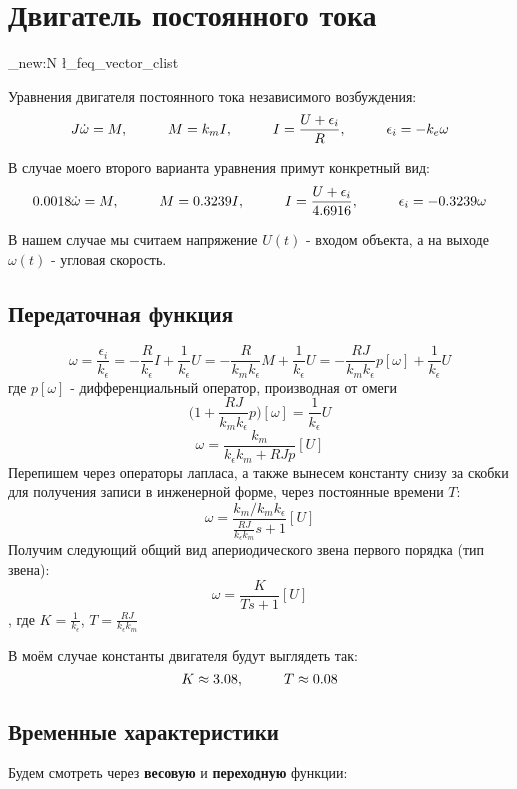 \chapter{Двигатель постоянного тока}
\label{ch:chap1}
\newcommand\tab[1][1cm]{\hspace*{#1}}

\ExplSyntaxOn
\clist_new:N \l_feq_vector_clist
\ExplSyntaxOff


Уравнения двигателя постоянного тока независимого возбуждения:
$$
  J\dot{\omega} = M, \tab M=k_mI, \tab I = \frac{U + \epsilon_i}{R}, \tab \epsilon_i = -k_e\omega
$$

В случае моего второго варианта уравнения примут конкретный вид:
$$
  0.0018\dot{\omega} = M, \tab M=0.3239I, \tab I = \frac{U + \epsilon_i}{4.6916}, \tab \epsilon_i = -0.3239\omega
$$

В нашем случае мы считаем напряжение $U(t)$ - входом объекта, а на выходе $\omega(t)$ - угловая скорость.

\section{Передаточная функция}
$$
\omega = \frac{\epsilon_i}{k_\epsilon} = -\frac{R}{k_\epsilon}I + \frac{1}{k_\epsilon}U = -\frac{R}{k_m k_\epsilon}M + \frac{1}{k_\epsilon}U = -\frac{RJ}{k_m k_\epsilon}p[\omega] + \frac{1}{k_\epsilon}U
$$ где $p[\omega]$ - дифференциальный оператор, производная от омеги
$$
\bigg(1 + \frac{RJ}{k_m k_\epsilon}p  \bigg)[\omega] = \frac{1}{k_\epsilon}U
$$
$$
\omega = \frac{k_m}{k_\epsilon k_m + RJp}[U]
$$
Перепишем через операторы лапласа, а также вынесем константу снизу за скобки для получения записи в инженерной форме, через постоянные времени $T$:
$$
\omega = \frac{k_m/k_mk_\epsilon}{\frac{RJ}{k_\epsilon k_m}s + 1}[U]
$$
Получим следующий общий вид апериодического звена первого порядка (тип звена):
$$
\omega = \frac{K}{Ts+1}[U]
$$, где $K = \frac{1}{k_\epsilon}$, $T = \frac{RJ}{k_\epsilon k_m}$

В моём случае константы двигателя будут выглядеть так:
$$
K \approx 3.08,\tab T \approx 0.08
$$

\section{Временные  характеристики}
Будем смотреть через \textbf{весовую} и \textbf{переходную} функции:

